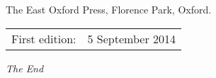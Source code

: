 \documentclass[17pt, a4paper,extrafontsizes]{memoir}
\begin{document}
The East Oxford Press, Florence Park, Oxford.

\begin{center}
\begin{tabular}{ll}
First edition:                        & 5 September 2014 \\
\end{tabular}
\end{center}
\clearpage
\tableofcontents*

\mainmatter
\thispagestyle{chapter}
\pagestyle{headings}


\begin{center}
\textit{The End}
\end{center}
\end{document}
